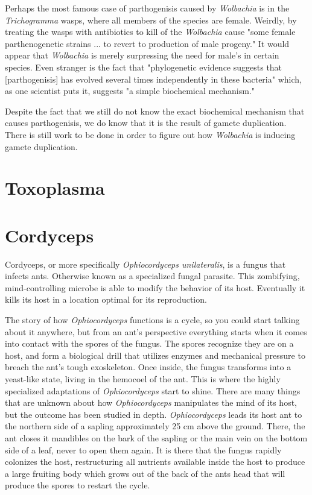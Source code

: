\documentclass[twocolumn]{article}
\begin{document}
Perhaps the most famous case of parthogenisis caused by \textit{Wolbachia} is in the \textit{Trichogramma} wasps, where all members of the species are female. Weirdly, by treating the wasps with antibiotics to kill of the \textit{Wolbachia} cause "some female parthenogenetic strains ... to revert to production of male progeny."\cite{Wpar_removal} It would appear that \textit{Wolbachia} is merely surpressing the need for male's in certain species. Even stranger is the fact that "phylogenetic evidence suggests that [parthogenisis] has evolved several times independently in these bacteria" which, as one scientist puts it, suggests "a simple biochemical mechanism."\cite{Wbio}  

Despite the fact that we still do not know the exact biochemical mechanism that causes parthogenisis, we do know that it is the result of gamete duplication.\cite{Wgamete_duplication} There is still work to be done in order to figure out how \textit{Wolbachia} is inducing gamete duplication.

\section*{Toxoplasma}

\section*{Cordyceps}
Cordyceps, or more specifically \textit{Ophiocordyceps unilateralis}, is a fungus that infects ants. Otherwise known as a specialized fungal parasite. This zombifying, mind-controlling microbe is able to modify the behavior of its host. Eventually it kills its host in a location optimal for its reproduction. 

The story of how \textit{Ophiocordyceps} functions is a cycle, so you could start talking about it anywhere, but from an ant's perspective everything starts when it comes into contact with the spores of the fungus. The spores recognize they are on a host, and form a biological drill that utilizes enzymes and mechanical pressure to breach the ant's tough exoskeleton. Once inside, the fungus transforms into a yeast-like state, living in the hemocoel of the ant.\cite{cordy_infection} This is where the highly specialized adaptations of \textit{Ophiocordyceps} start to shine. There are many things that are unknown about how \textit{Ophiocordyceps} manipulates the mind of its host, but the outcome has been studied in depth. \textit{Ophiocordyceps} leads its host ant to the northern side of a sapling approximately 25 cm above the ground. There, the ant closes it mandibles on the bark of the sapling or the main vein on the bottom side of a leaf, never to open them again. It is there that the fungus rapidly colonizes the host, restructuring all nutrients available inside the host to produce a large fruiting body which grows out of the back of the ants head that will produce the spores to restart the cycle.\cite{life_of_dead_ant}
\end{document}
